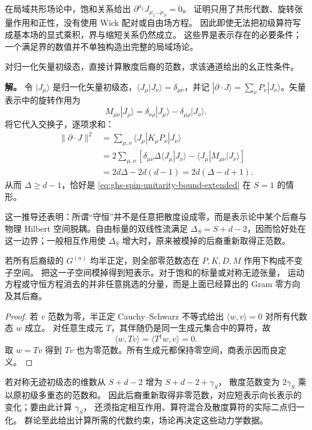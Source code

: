 在局域共形场论中，饱和关系给出 $\partial^{\mu_1}J_{\mu_1\ldots\mu_S}=0$。
证明只用了共形代数、旋转张量作用和正性，没有使用 Wick 配对或自由场方程。
因此即使无法把初级算符写成基本场的显式乘积，界与缩短关系仍然成立。
这些界是表示存在的必要条件；一个满足界的数值并不单独构造出完整的局域场论。

\begin{example}[矢量散度通道的直接核对]
对归一化矢量初级态，直接计算散度后裔的范数，求该通道给出的幺正性条件。

\textbf{解。} 令 $|J_\mu\rangle$ 是归一化矢量初级态，$\langle J_\mu|J_\nu\rangle=\delta_{\mu\nu}$，并记 $|\partial\cdot J\rangle=\sum_\nu P_\nu|J_\nu\rangle$。矢量表示中的旋转作用为
 \begin{equation*}
 M_{\mu\nu}|J_\rho\rangle
 =\delta_{\nu\rho}|J_\mu\rangle-\delta_{\mu\rho}|J_\nu\rangle.
 \end{equation*}
 将它代入交换子，逐项求和：
 \begin{align*}
 \|\partial\cdot J\|^2
 &=\sum_{\mu,\nu}\langle J_\mu|K_\mu P_\nu|J_\nu\rangle\\
 &=2\sum_{\mu,\nu}\left[\delta_{\mu\nu}\Delta
 \langle J_\mu|J_\nu\rangle
 -\langle J_\mu|M_{\mu\nu}|J_\nu\rangle\right]\\
 &=2d\Delta-2d(d-1)=2d(\Delta-d+1).
 \end{align*}
 从而 $\Delta\ge d-1$，恰好是 \cref{eq:ghs-spin-unitarity-bound-extended} 在 $S=1$ 的情形。
\end{example}

这一推导还表明：所谓“守恒”并不是任意把散度设成零，而是表示论中某个后裔与物理 Hilbert 空间脱耦。自由标量的双线性流满足 $\Delta_S=S+d-2$，因而恰好处在这一边界；一般相互作用使 $\Delta_S$ 增大时，原来被模掉的后裔重新取得正范数。


\begin{proposition}[零范数子空间与短表示]
若所有后裔级的 $G^{(n)}$ 均半正定，则全部零范数态在 $P,K,D,M$ 作用下构成不变子空间。
把这一子空间模掉得到短表示。对于饱和的标量或对称无迹张量，
运动方程或守恒方程消去的并非任意挑选的分量，而是上面已经算出的 Gram 零方向及其后裔。
\end{proposition}
\begin{proof}
若 $v$ 范数为零，半正定 Cauchy--Schwarz 不等式给出 $\langle w,v\rangle=0$ 对所有代数态 $w$ 成立。
对任意生成元 $T$，其伴随仍是同一生成元集合中的算符，故
\[
 \langle w,Tv\rangle=\langle T^\dagger w,v\rangle=0.
\]
取 $w=Tv$ 得到 $Tv$ 也为零范数。所有生成元都保持零空间，商表示因而良定义。
\end{proof}

若对称无迹初级态的维数从 $S+d-2$ 增为 $S+d-2+\gamma_S$，
散度范数变为 $2\gamma_S$ 乘以原初级多重态的范数和。
因此后裔重新取得非零范数，对应短表示向长表示的变化；要由此计算 $\gamma_S$，
还须指定相互作用、算符混合及散度算符的实际二点归一化。
群论至此给出计算所需的代数约束，场论再决定这些动力学数据。
